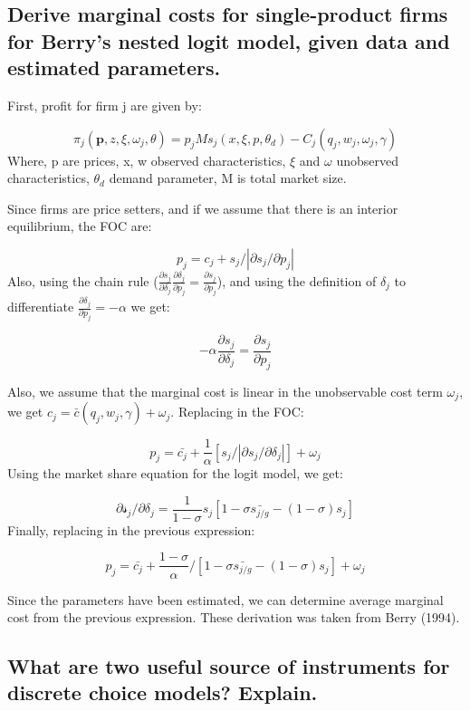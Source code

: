 \documentclass[]{article}
\begin{document}
\hypertarget{derive-marginal-costs-for-single-product-firms-for-berrys-nested-logit-model-given-data-and-estimated-parameters.}{%
\subsection{Derive marginal costs for single-product firms for Berry's
nested logit model, given data and estimated
parameters.}\label{derive-marginal-costs-for-single-product-firms-for-berrys-nested-logit-model-given-data-and-estimated-parameters.}}

First, profit for firm j are given by:

\[\pi_j(\mathbf{p}, z, \xi , \omega_j, \theta) = p_j M s_j(x, \xi, p, \theta_d) - C_j(q_j, w_j, \omega_j, \gamma)\]
Where, p are prices, x, w observed characteristics, \(\xi\) and
\(\omega\) unobserved characteristics, \(\theta_d\) demand parameter, M
is total market size.

Since firms are price setters, and if we assume that there is an
interior equilibrium, the FOC are:

\[p_j = c_j + s_j/|\partial s_j/ \partial p_j| \] Also, using the chain
rule
(\(\frac{\partial s_j}{\partial \delta_j}\frac{\partial \delta_j}{\partial p_j} = \frac{\partial s_j}{\partial p_j}\)),
and using the definition of \(\delta_j\) to differentiate
\(\frac{\partial \delta_j}{\partial p_j} = -\alpha\) we get:

\[- \alpha \frac{\partial s_j}{\partial \delta_j} = \frac{\partial s_j}{\partial p_j} \]

Also, we assume that the marginal cost is linear in the unobservable
cost term \(\omega_j\), we get
\(c_j = \bar{c}(q_j, w_j, \gamma) + \omega_j\). Replacing in the FOC:

\[ p_j = \bar{c_j} + \frac{1}{\alpha}[s_j/|\partial s_j/ \partial \delta_j|] + \omega_j \]
Using the market share equation for the logit model, we get:

\[ \partial \mathcal{s}_j/ \partial \delta_j = \frac{1}{1-\sigma}s_j[1 - \sigma \bar{s_{j/g}}-(1-\sigma)s_j]\]
Finally, replacing in the previous expression:

\[ 
p_j = \bar{c_j} + \frac{1-\sigma}{\alpha}/[1 - \sigma \bar{s_{j/g}}-(1-\sigma)s_j] + \omega_j
\]

Since the parameters have been estimated, we can determine average
marginal cost from the previous expression. These derivation was taken
from Berry (1994).

\hypertarget{what-are-two-useful-source-of-instruments-for-discrete-choice-models-explain.}{%
\subsection{What are two useful source of instruments for discrete
choice models?
Explain.}\label{what-are-two-useful-source-of-instruments-for-discrete-choice-models-explain.}}
\end{document}
